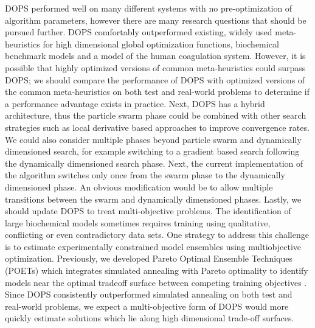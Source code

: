 \documentclass[12pt]{article}
\begin{document}

DOPS performed well on many different systems with no pre-optimization of algorithm parameters, however there are many research questions that should be pursued further.
DOPS comfortably outperformed existing, widely used meta-heuristics for high dimensional global optimization functions, biochemical benchmark models and a model of the human coagulation system.
However, it is possible that highly optimized versions of common meta-heuristics could surpass DOPS;
we should compare the performance of DOPS with optimized versions of the common
meta-heuristics on both test and real-world problems to determine if a performance advantage exists in practice.
Next, DOPS has a hybrid architecture, thus the particle swarm phase could be combined with other search strategies such as local derivative based approaches to improve convergence rates.
We could also consider multiple phases beyond particle swarm and dynamically dimensioned search, for example switching to a gradient based search following the dynamically
dimensioned search phase.
Next, the current implementation of the algorithm switches only once from the swarm phase to the dynamically dimensioned phase.
An obvious modification would be to allow multiple transitions between the swarm and dynamically dimensioned phases.
Lastly, we should update DOPS to treat multi-objective problems.
The identification of large biochemical models sometimes requires training using qualitative, conflicting or even contradictory data sets.
One strategy to address this challenge is to estimate experimentally constrained model ensembles using multiobjective optimization.
Previously, we developed Pareto Optimal Ensemble Techniques (POETs) which integrates simulated annealing with Pareto optimality
to identify models near the optimal tradeoff surface between competing training objectives \cite{song2010ensembles}.
Since DOPS consistently outperformed simulated annealing on both test and real-world problems, we expect a multi-objective form of DOPS would more quickly estimate solutions
which lie along high dimensional trade-off surfaces.
\end{document}
